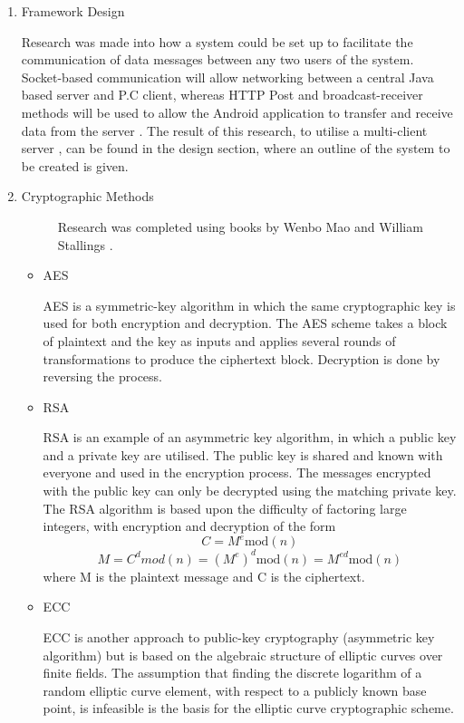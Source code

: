 \documentclass[a4paper,11pt]{article}
\begin{document}
\begin{enumerate}
  \item
  \begin{description}
    \item[Framework Design] 
  \end{description}
  Research was made into how a system could be set up to facilitate the communication of data messages between any two users of the system. Socket-based communication will allow networking between a central Java based server and P.C client, whereas HTTP Post and broadcast-receiver methods will be used to allow the Android application to transfer and receive data from the server \cite{markogargenta}. The result of this research, to utilise a multi-client server \cite{ydanielliang}, can be found in the design section, where an outline of the system to be created is given.
  \item
  \begin{description}
    \item[Cryptographic Methods]
    Research was completed using books by Wenbo Mao \cite{wenbomao} and William Stallings \cite{willstallings}.
  \end{description}
    \begin{itemize}
      \item
      \begin{description}
        \item[AES] 
      \end{description}
      AES is a symmetric-key algorithm in which the same cryptographic key is used for both encryption and decryption. The AES scheme takes a block of plaintext and the key as inputs and applies several rounds of transformations to produce the ciphertext block. Decryption is done by reversing the process.
      \item
      \begin{description}
        \item[RSA] 
      \end{description}
      RSA is an example of an asymmetric key algorithm, in which a public key and a private key are utilised. The public key is shared and known with
everyone and used in the encryption process. The messages encrypted with
the public key can only be decrypted using the matching private key. The RSA algorithm is based upon the difficulty of factoring large
integers, with encryption and decryption of the form 
\[ C = M^{e} \mathrm{mod}(n) \]
\[M = C^{d} mod(n) = (M^{e})^{d} \mathrm{mod}(n) = M^{ed} \mathrm{mod}(n) \]
where M is the plaintext message and C is the ciphertext.
      \item
      \begin{description}
        \item[ECC] 
      \end{description}
      ECC is another approach to public-key cryptography (asymmetric key algorithm) but is based on the algebraic structure of elliptic curves over finite fields. The assumption that finding the discrete logarithm of a random elliptic curve element, with respect to a publicly known base point, is infeasible is the basis for the elliptic curve cryptographic scheme.
    \end{itemize}


\end{enumerate}
\end{document}
